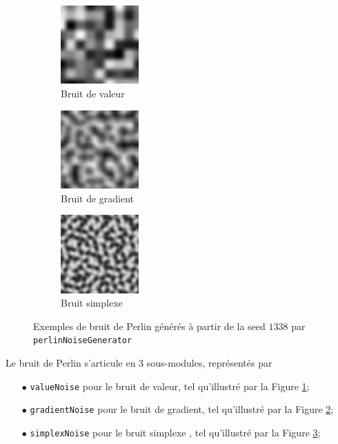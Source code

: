\documentclass[11pt]{article}
\begin{document}
\begin{figure}[H]
    \centering
    \begin{subfigure}{0.2\textwidth}
    \centering
            \includegraphics[width=3cm]{PERLIN-VALUE-S1338.png}
        \caption{Bruit de valeur}
        \label{fig:perlinValueNoise}
    \end{subfigure}
    \begin{subfigure}{0.2\textwidth}
    \centering
        \includegraphics[width=3cm]{PERLIN-GRADIENT-S1338.png}
        \caption{Bruit de gradient}
        \label{fig:perlinGradientNoise}
    \end{subfigure}
    \begin{subfigure}{0.2\textwidth}
    \centering
        \includegraphics[width=3cm]{PERLIN-SIMPLEX-S1338.png}
        \caption{Bruit simplexe}
        \label{fig:perlinSimplexNoise}
    \end{subfigure}
    \caption{Exemples de bruit de Perlin générés à partir de la seed $1338$ par \texttt{perlinNoiseGenerator}}
    \label{fig:perlinNoise}
\end{figure}

Le bruit de Perlin s'articule en 3 sous-modules, représentés par
\begin{itemize}
    \item [$\bullet$] \texttt{valueNoise} pour le bruit de valeur, tel qu'illustré par la Figure \ref{fig:perlinValueNoise};
    \item [$\bullet$] \texttt{gradientNoise} pour le bruit de gradient, tel qu'illustré par la Figure \ref{fig:perlinGradientNoise};
    \item [$\bullet$] \texttt{simplexNoise} pour le bruit simplexe \cite{simplexNoise}, tel qu'illustré par la Figure \ref{fig:perlinSimplexNoise};
\end{itemize}
\end{document}
